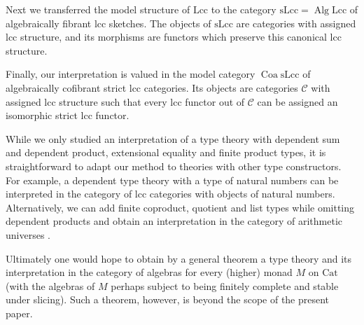 \documentclass[a4paper]{article}
\theoremstyle{remark}
\theoremstyle{definition}
\begin{document}
Next we transferred the model structure of $\mathrm{Lcc}$ to the category $\mathrm{sLcc} = \operatorname{Alg} \mathrm{Lcc}$ of algebraically fibrant lcc sketches.
The objects of $\mathrm{sLcc}$ are categories with assigned lcc structure, and its morphisms are functors which preserve this canonical lcc structure.

Finally, our interpretation is valued in the model category $\operatorname{Coa} \mathrm{sLcc}$ of algebraically cofibrant strict lcc categories.
Its objects are categories $\mathcal{C}$ with assigned lcc structure such that every lcc functor out of $\mathcal{C}$ can be assigned an isomorphic strict lcc functor.

While we only studied an interpretation of a type theory with dependent sum and dependent product, extensional equality and finite product types, it is straightforward to adapt our method to theories with other type constructors.
For example, a dependent type theory with a type of natural numbers can be interpreted in the category of lcc categories with objects of natural numbers.
Alternatively, we can add finite coproduct, quotient and list types while omitting dependent products and obtain an interpretation in the category of arithmetic universes \citep{au-as-list-arithmetic-pretopos,au-sketches}.

Ultimately one would hope to obtain by a general theorem a type theory and its interpretation in the category of algebras for every (higher) monad $M$ on $\mathrm{Cat}$ (with the algebras of $M$ perhaps subject to being finitely complete and stable under slicing).
Such a theorem, however, is beyond the scope of the present paper.



\end{document}

